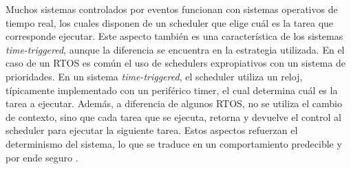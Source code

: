 


Muchos sistemas controlados por eventos funcionan con sistemas operativos de tiempo real, los cuales disponen de un scheduler que elige cuál es la tarea que corresponde ejecutar. Este aspecto también es una característica de los sistemas \textit{time-triggered}, aunque la diferencia se encuentra en la estrategia utilizada. En el caso de un RTOS es común el uso de schedulers expropiativos con un sistema de prioridades. En un sistema \textit{time-triggered}, el scheduler utiliza un reloj, típicamente implementado con un periférico timer, el cual determina cuál es la tarea a ejecutar. Además, a diferencia de algunos RTOS, no se utiliza el cambio de contexto, sino que cada tarea que se ejecuta, retorna y devuelve el control al scheduler para ejecutar la siguiente tarea. Estos aspectos refuerzan el determinismo del sistema, lo que se traduce en un comportamiento predecible y por ende seguro \cite[p.~247]{pont2008patterns}.




